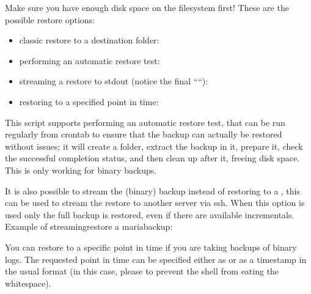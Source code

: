 \documentclass[letterpaper,10pt,english]{sphinxmanual}
\begin{document}

Make sure you have enough disk space on the  filesystem first!
These are the possible restore options:
\begin{itemize}
\item {} 
classic restore to a destination folder:

\item {} 
performing an automatic restore test:

\item {} 
streaming a restore to stdout (notice the final “\sphinxhyphen{}“):

\item {} 
restoring to a specified point in time:

\end{itemize}

This script supports performing an automatic restore test, that can be run regularly
from crontab to ensure that the backup can actually be restored without issues; it
will create a folder, extract the backup in it, prepare it, check the successful
completion status, and then clean up after it, freeing disk space. This is only
working for binary backups.

It is also possible to stream the (binary) backup instead of restoring to a
, this can be used to stream the restore to another server via ssh.
When this option is used only the full backup is restored, even if there are available
incrementals.  Example of streaming\sphinxhyphen{}restore a mariabackup:


You can restore to a specific point in time if you are taking backups of binary logs.
The requested point in time can be specified either as  or as a timestamp
in the usual  format (in this case, please 
to prevent the shell from eating the whitespace).
\end{document}
